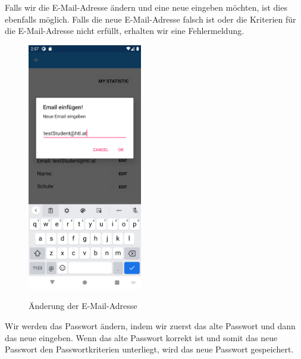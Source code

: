 \newline
Falls wir die E-Mail-Adresse ändern und eine neue eingeben möchten, ist dies ebenfalls möglich. Falls die neue E-Mail-Adresse falsch ist oder die Kriterien für die E-Mail-Adresse nicht erfüllt, erhalten wir eine Fehlermeldung.
\begin{figure}[h]
    \begin{center}
    \includegraphics[width=5cm]{pics/Xamarin Student/26 New Email.png}\
    \caption[MyAccount]{Änderung der E-Mail-Adresse}
    \end{center}
\end{figure}
\newpage
Wir werden das Passwort ändern, indem wir zuerst das alte Passwort und dann das neue eingeben. Wenn das alte Passwort korrekt ist und somit das neue Passwort den Passwortkriterien unterliegt, wird das neue Passwort gespeichert.
